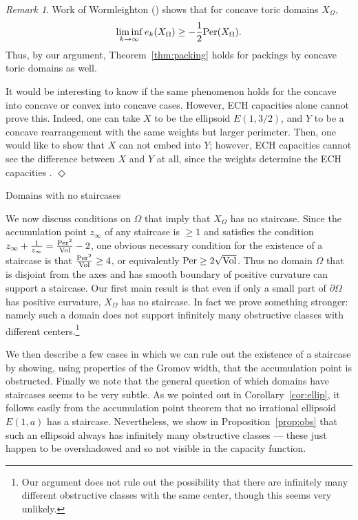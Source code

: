 \documentclass[11pt, reqno]{amsart}
\makeatletter
\def\section{\@startsection{section}{1}%
  \z@{.7\linespacing\@plus\linespacing}{.5\linespacing}%
  {\normalfont\Large\bfseries}}
\theoremstyle{remark}
\numberwithin{equation}{subsection}
\numberwithin{figure}{section}
\theoremstyle{customremark}
\newtheorem{rmk_no_diamond}[thm]{Remark}
\newenvironment{rmk}{\begin{rmk_no_diamond} } {\hfill$\er$ \end{rmk_no_diamond}}
\newcommand{\Vol}{{\rm Vol}}
\newcommand{\Per}{{\rm Per}}
\newcommand{\Om}{{\Omega}}
\newcommand{\p}{{\partial}}
\newcommand{\er}{{\Diamond}}
\makeatother
\begin{document}
\begin{rmk}
\label{rem:wormleighton}
Work of Wormleighton (\cite[Thm. 3]{Wormleighton}) shows that for concave toric domains $X_{\Omega}$,
\[ \liminf_{k \to \infty} e_k(X_{\Omega}) \ge -\frac{1}{2} \Per(X_{\Omega}).\]
Thus, by our argument, Theorem~\ref{thm:packing} holds for packings by concave toric domains as well.
 
It would be interesting to know if the same phenomenon holds for the concave into concave or convex into concave cases.  However, ECH capacities alone cannot prove this.  Indeed, one can take $X$ to be the ellipsoid $E(1,3/2)$, and $Y$ to be a concave rearrangement with the same weights but larger perimeter.  Then, one would like to show that $X$ can not embed into $Y$;  however, ECH capacities cannot see the difference between $X$ and $Y$ at all, since the weights determine the ECH capacities \cite{Choi}. 
\end{rmk}






\section{Domains with no staircases}\label{sec:nostair}
 
 We now discuss conditions on $\Om$ that imply that $X_\Om$ has no staircase. Since the accumulation point $z_\infty$ of any staircase is $\ge 1$ and satisfies the condition $z_\infty + \frac 1{z_\infty} = \frac{\Per^2}{\Vol} - 2$, one obvious necessary condition for the existence of a staircase is that 
 $\frac{\Per^2}{\Vol} \ge 4$, or equivalently $\Per \ge 2\sqrt{\Vol}$.  Thus no domain $\Om$ that is disjoint from the axes and has  smooth boundary of positive curvature can support  a staircase. Our first main result is that even if only a small part of $\p \Om$ has positive curvature, %
 $X_\Om$ has no staircase.
In fact we prove something stronger: namely such a domain does not support infinitely many obstructive classes with different centers.\footnote
{Our argument does not rule out the possibility that there are infinitely many different obstructive classes with the same center, though this seems very unlikely.} 


We then describe a few cases in which we can rule out the existence of a staircase  by showing, using properties of the Gromov width,  that the accumulation point is obstructed.  Finally we note that
the general question of which domains have staircases seems to be  very subtle. As we pointed out in Corollary~\ref{cor:ellip}, it follows easily from the accumulation point theorem that   no irrational ellipsoid $E(1,a)$ has a staircase. Nevertheless, we show in Proposition~\ref{prop:obs} that such an ellipsoid always has infinitely many obstructive classes --- these just happen to be overshadowed and so not visible in the capacity function.
\end{document}
